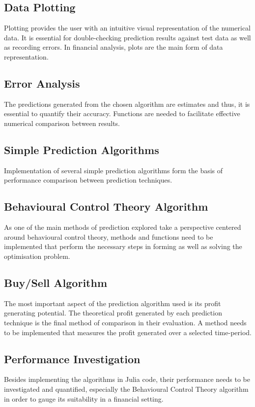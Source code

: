 \subsection{Data Plotting}
Plotting provides the user with an intuitive visual representation of the numerical data. It is essential for double-checking prediction results against test data as well as recording errors. In financial analysis, plots are the main form of data representation. 

\subsection{Error Analysis}
 The predictions generated from the chosen algorithm are estimates and thus, it is essential to quantify their accuracy. Functions are needed to facilitate effective numerical comparison between results.

\subsection{Simple Prediction Algorithms}
Implementation of several simple prediction algorithms form the basis of performance comparison between prediction techniques. 

\subsection{Behavioural Control Theory Algorithm}
As one of the main methods of prediction explored take a perspective centered around behavioural control theory, methods and functions need to be implemented that perform the necessary steps in forming as well as solving the optimisation problem.

\subsection{Buy/Sell Algorithm}
The most important aspect of the prediction algorithm used is its profit generating potential. The theoretical profit generated by each prediction technique is the final method of comparison in their evaluation. A method needs to be implemented that measures the profit generated over a selected time-period.

\subsection{Performance Investigation}
Besides implementing the algorithms in Julia code, their performance needs to be investigated and quantified, especially the Behavioural Control Theory algorithm in order to gauge its suitability in a financial setting.

